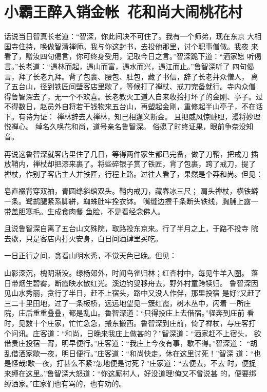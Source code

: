 \chapter{小霸王醉入销金帐~花和尚大闹桃花村}

话说当日智真长老道：“智深，你此间决不可住了。我有一个师弟，现在东京
大相国寺住持，唤做智清禅师。我与你这封书，去投他那里，讨个职事僧做。我夜
来看了，赠汝四句偈言，你可终身受用，记取今日之言。”智深跪下道：“洒家愿
听偈言。”长老道：“遇林而起，遇山而富，遇水而兴，遇江而止。”鲁智深听了
四句偈言，拜了长老九拜。背了包裹、腰包、肚包，藏了书信，辞了长老并众僧人，
离了五台山，径到铁匠间壁客店里歇了，等候打了禅杖、戒刀完备就行。寺内众僧
得鲁智深去了，无一个不欢喜。长老教火工道人自来收拾打坏了的金刚、亭子。过
不得数日，赵员外自将若干钱物来五台山，再塑起金刚，重修起半山亭子，不在话
下。有诗为证：
禅林辞去入禅林，知己相逢义断金。
且把威风惊贼胆，漫将妙理悦禅心。
绰名久唤花和尚，道号亲名鲁智深。
俗愿了时终证果，眼前争奈没知音。

再说这鲁智深就客店里住了几日，等得两件家生都已完备，做了刀鞘，把戒刀
插放鞘内，禅杖却把漆来裹了。将些碎银子赏了铁匠，背了包裹，跨了戒刀，提了
禅杖，作别了客店主人并铁匠，行程上路。过往人看了，果然是个莽和尚。但见：

皂直裰背穿双袖，青圆绦斜绾双头。鞘内戒刀，藏春冰三尺；
肩头禅杖，横铁蟒一条。鹭鹚腿紧系脚絣，蜘蛛肚牢拴衣钵。
嘴缝边攒千条断头铁线，胸脯上露一带盖胆寒毛。生成食肉餐
鱼脸，不是看经念佛人。

且说鲁智深自离了五台山文殊院，取路投东京来。行了半月之上，于路不投寺
院去歇，只是客店内打火安身，白日间酒肆里买吃。

一日正行之间，贪看山明水秀，不觉天色已晚。但见：

山影深沉，槐阴渐没。绿杨郊外，时闻鸟雀归林；红杏村中，每见牛羊入圈。
落日带烟生碧雾，断霞映水散红光。溪边钓叟移舟去，野外村童跨犊归。
鲁智深因见山水秀丽，贪行了半日，赶不上宿头，路中又没人作伴，那里投宿
是好?又赶了三二十里田地，过了一条板桥，远远地望见一簇红霞，树木丛中，闪着
一所庄院，庄后重重叠叠，都是乱山。鲁智深道：“只得投庄上去借宿。”径奔到庄前
看时，见数十个庄家，忙忙急急，搬东搬西。鲁智深到庄前，倚了禅杖，与庄客打
个问讯。庄客道：“和尚，日晚来我庄上做甚的？”智深道：“洒家赶不上宿头，
欲借贵庄投宿一宵，明早便行。”庄客道：“我庄上今夜有事，歇不得。”智深道：
“胡乱借洒家歇一夜，明日便行。”庄客道：“和尚快走，休在这里讨死！”智深
道：“也是怪哉!歇一夜，打甚么不紧?怎地便是讨死？”庄家道：“去便去，不去
时，便捉来缚在这里。”鲁智深大怒道：“你这厮村人，好没道理!俺又不曾说甚
的，便要绑缚洒家。”庄家们也有骂的，也有劝的。

